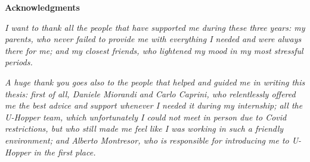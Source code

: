 \thispagestyle{empty}

\begin{center}
  {\bf \Huge Acknowledgments}
\end{center}

\vspace{4cm}


\emph{I want to thank all the people that have supported me during these three years: my parents, who never failed to provide me with everything I needed and were always there for me; and my closest friends, who lightened my mood in my most stressful periods.}

\emph{A huge thank you goes also to the people that helped and guided me in writing this thesis: first of all, Daniele Miorandi and Carlo Caprini, who relentlessly offered me the best advice and support whenever I needed it during my internship; all the U-Hopper team, which unfortunately I could not meet in person due to Covid restrictions, but who still made me feel like I was working in such a friendly environment; and Alberto Montresor, who is responsible for introducing me to U-Hopper in the first place.}
